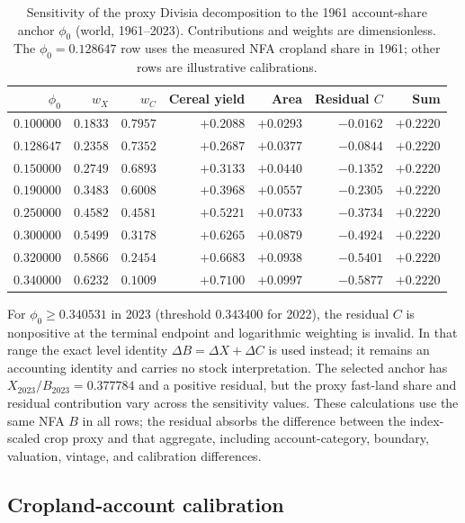 \begin{table}[htbp]
\centering\footnotesize
\caption{Sensitivity of the proxy Divisia decomposition to the 1961 account-share anchor $\phi_0$ (world, 1961--2023). Contributions and weights are dimensionless. The $\phi_0=0.128647$ row uses the measured NFA cropland share in 1961; other rows are illustrative calibrations.}
\label{tab:si_phi0}
\begin{tabular}{r r r r r r r}
\toprule
$\phi_0$ & $w_X$ & $w_C$ & Cereal yield & Area & Residual $C$ & Sum \\
\midrule
$0.100000$ & $0.1833$ & $0.7957$ & $+0.2088$ & $+0.0293$ & $-0.0162$ & $+0.2220$ \\
$0.128647$ & $0.2358$ & $0.7352$ & $+0.2687$ & $+0.0377$ & $-0.0844$ & $+0.2220$ \\
$0.150000$ & $0.2749$ & $0.6893$ & $+0.3133$ & $+0.0440$ & $-0.1352$ & $+0.2220$ \\
$0.190000$ & $0.3483$ & $0.6008$ & $+0.3968$ & $+0.0557$ & $-0.2305$ & $+0.2220$ \\
$0.250000$ & $0.4582$ & $0.4581$ & $+0.5221$ & $+0.0733$ & $-0.3734$ & $+0.2220$ \\
$0.300000$ & $0.5499$ & $0.3178$ & $+0.6265$ & $+0.0879$ & $-0.4924$ & $+0.2220$ \\
$0.320000$ & $0.5866$ & $0.2454$ & $+0.6683$ & $+0.0938$ & $-0.5401$ & $+0.2220$ \\
$0.340000$ & $0.6232$ & $0.1009$ & $+0.7100$ & $+0.0997$ & $-0.5877$ & $+0.2220$ \\
\bottomrule
\end{tabular}
\end{table}

For $\phi_0\ge 0.340531$ in 2023 (threshold $0.343400$ for 2022), the residual $C$ is nonpositive at the terminal endpoint and logarithmic weighting is invalid. In that range the exact level identity $\Delta B=\Delta X+\Delta C$ is used instead; it remains an accounting identity and carries no stock interpretation. The selected anchor has $X_{2023}/B_{2023}=0.377784$ and a positive residual, but the proxy fast-land share and residual contribution vary across the sensitivity values. These calculations use the same NFA $B$ in all rows; the residual absorbs the difference between the index-scaled crop proxy and that aggregate, including account-category, boundary, valuation, vintage, and calibration differences.

\subsection{Cropland-account calibration}\label{si:cropland}

